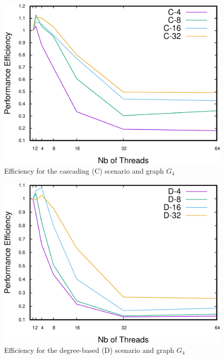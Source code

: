 \begin{figure}
\centering
\includegraphics[scale=0.35]{bench/generated/efficiency-c-4-crop.pdf}
\caption{Efficiency for the cascading (C) scenario and graph $G_4$}
\label{fig:effc4}
\end{figure}

\begin{figure}
\centering
\includegraphics[scale=0.35]{bench/generated/efficiency-d-4-crop.pdf}
\caption{Efficiency for the degree-based (D) scenario and graph $G_4$}
\label{fig:effd4}
\end{figure}


